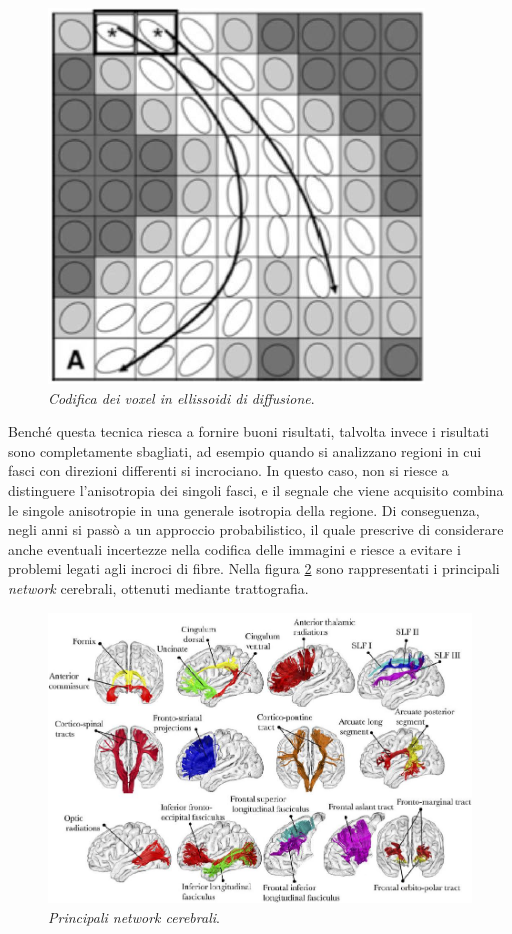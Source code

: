 \documentclass{report}
\newcommand{\figref}[1]{figura \ref{#1}}
\numberwithin{equation}{section}
\numberwithin{figure}{section}
\begin{document}
\begin{figure}[htp]
\centering
\includegraphics[scale=0.9]{immagini/tratto.png}
\caption{\label{fig:tratto} \textit{Codifica dei voxel in ellissoidi di diffusione}.}
\end{figure}

Benché questa tecnica riesca a fornire buoni risultati, talvolta invece i risultati sono completamente sbagliati, ad esempio quando si analizzano regioni in cui fasci con direzioni differenti si incrociano. In questo caso, non si riesce a distinguere l'anisotropia dei singoli fasci, e il segnale che viene acquisito combina le singole anisotropie in una generale isotropia della regione. Di conseguenza, negli anni si passò a un approccio probabilistico, il quale prescrive di considerare anche eventuali incertezze nella codifica delle immagini e riesce a evitare i problemi legati agli incroci di fibre. Nella \figref{fig:tratti} sono rappresentati i principali \textit{network} cerebrali, ottenuti mediante trattografia.

\begin{figure}[htp]
\centering
\includegraphics[scale=0.75]{immagini/tratti.png}
\caption{\label{fig:tratti} \textit{Principali network cerebrali}.}
\end{figure}
\end{document}
